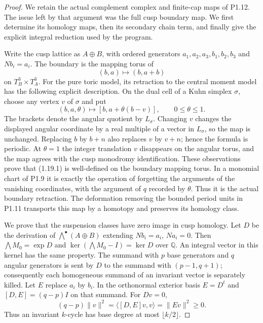 \begin{proof}
We retain the actual complement complex and finite-cap maps of P1.12.
The issue left by that argument was the full cusp boundary map.
We first determine its homology maps, then its secondary chain term,
and finally give the explicit integral reduction used by the program.

Write the cusp lattice as $A\oplus B$, with ordered generators
$a_1,a_2,a_3,b_1,b_2,b_3$ and $Nb_i=a_i$.
The boundary is the mapping torus of
\[
 (b,a)\longmapsto(b,a+b)
\]
on $T_B^3\times T_A^3$.
For the pure toric model, its retraction to the central moment model
has the following explicit description.  On the dual cell of a Kuhn
simplex $\sigma$, choose any vertex $v$ of $\sigma$ and put
\[
 (b,a,\theta)\longmapsto
   [b,a+\theta(b-v)],\qquad0\leq\theta\leq1.
\tag{1.19.1}
\]
The brackets denote the angular quotient by $L_\sigma$.
Changing $v$ changes the displayed angular coordinate by a real
multiple of a vector in $L_\sigma$, so the map is unchanged.
Replacing $b$ by $b+n$ also replaces $v$ by $v+n$; hence the formula
is periodic.  At $\theta=1$ the integer translation $v$ disappears
on the angular torus, and the map agrees with the cusp monodromy
identification.  These observations prove that (1.19.1) is well-defined
on the boundary mapping torus.  In a monomial chart of P1.9 it is
exactly the operation of forgetting the arguments of the vanishing
coordinates, with the argument of $q$ recorded by $\theta$.
Thus it is the actual boundary retraction.  The deformation removing
the bounded period units in P1.11 transports this map by a homotopy
and preserves its homology class.

We prove that the suspension classes have zero image in cusp homology.
Let $D$ be the derivation of $\bigwedge^\bullet(A\oplus B)$ extending
$Nb_i=a_i$, $Na_i=0$.  Then $\bigwedge M_0=\exp D$ and
$\ker(\bigwedge M_0-I)=\ker D$ over $\mathbb Q$.
An integral vector in this kernel has the same property.
The summand with $p$ base generators and $q$ angular generators is
sent by $D$ to the summand with $(p-1,q+1)$; consequently each
homogeneous summand of an invariant vector is separately killed.
Let $E$ replace $a_i$ by $b_i$. In the orthonormal exterior basis
$E=D^t$ and $[D,E]=(q-p)I$ on that summand.  For $Dv=0$,
\[
 (q-p)\|v\|^2
 =\langle[D,E]v,v\rangle=\|Ev\|^2\geq0.
\]
Thus an invariant $k$-cycle has base degree at most $\lfloor k/2\rfloor$.


\end{proof}
